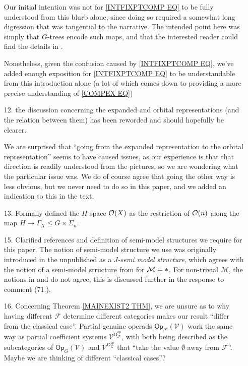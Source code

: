 \documentclass{article}
\begin{document}
\begin{itemize}
	Our initial intention was not for
	\eqref{INTFIXPTCOMP EQ}
	to be fully understood from this blurb alone,
	since doing so required a somewhat long digression 
	that was tangential to the narrative.
	The intended point here
	was simply that $G$-trees encode such maps,
	and that the interested reader could find the details in \cite[\S 4]{Pe17}.
	
	Nonetheless, given the confusion caused by
	\eqref{INTFIXPTCOMP EQ},
	we've added enough exposition 
	for \eqref{INTFIXPTCOMP EQ} to be understandable from this introduction alone
	(a lot of which comes down
	to providing a more precise understanding of
	\eqref{COMPEX EQ})
	
	
	\item[12.] 
	the discussion concerning the expanded and orbital representations (and the relation between them) has been reworded and should hopefully be clearer.
	
	We are surprised that
	``going from the expanded representation to the orbital representation''
	seems to have caused issues, 
	as our experience is that that direction is 
	readily understood from the pictures,
	so we are wondering what the particular issue was.
	We do of course agree that going the other way is less obvious,
	but we never need to do so in this paper,
	and we added an indication to this in the text.
	


  \item[13.] Formally defined the $H$-space $\mathcal{O}(X)$ as the restriction of $\mathcal{O}(n)$ along the map $H \to \Gamma_X \leq G \times \Sigma_n$.
        
	\item[15.] Clarified references and definition of semi-model structures we require for this paper.
	The notion of semi-model structure we use was originally introduced in the unpublished \cite{Spi01} as a \textit{$J$-semi model structure},
	which agrees with the notion of a semi-model structure from \cite{WY18} for $\mathcal M = \**$.
	For non-trivial $\mathcal M$, the notions in \cite{Spi01} and \cite{WY18} do not agree;
	this is discussed further in the response to comment (71.).
	
	\item[16.] Concerning Theorem \ref{MAINEXIST2 THM},
	we are unsure as to why 
	having different $\mathcal{F}$ determine
	different categories makes our result
	``differ from the classical case''. 
	Partial genuine operads $\mathsf{Op}_{\mathcal{F}}(\mathcal{V})$
	work the same way as partial coefficient
	systems $\mathcal{V}^{\mathsf{O}_{\mathcal{F}}^{op}}$,
	with both being described as the subcategories
	of $\mathsf{Op}_{G}(\mathcal{V})$ and
	$\mathcal{V}^{\mathsf{O}_{G}^{op}}$
	that ``take the value $\emptyset$ away from $\mathcal{F}$''.
	Maybe we are thinking of different ``classical cases''? 
	

\end{itemize}
\end{document}
